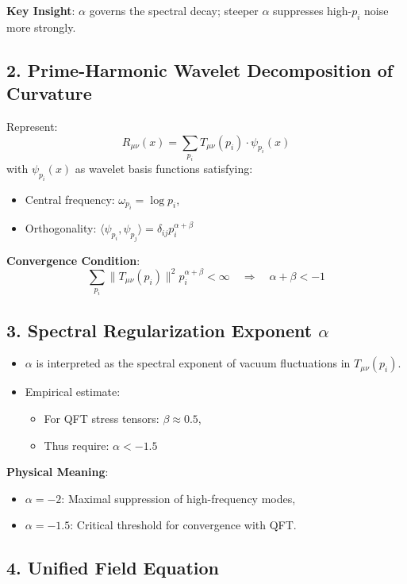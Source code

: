 \documentclass[12pt]{article}
\theoremstyle{plain}
\begin{document}
\textbf{Key Insight}: \(\alpha\) governs the spectral decay; steeper \(\alpha\) suppresses high-\(p_i\) noise more strongly.

\subsection*{2. Prime-Harmonic Wavelet Decomposition of Curvature}

Represent:
\[
R_{\mu\nu}(x) = \sum_{p_i} T_{\mu\nu}(p_i) \cdot \psi_{p_i}(x)
\]
with \(\psi_{p_i}(x)\) as wavelet basis functions satisfying:
\begin{itemize}
    \item Central frequency: \(\omega_{p_i} = \log p_i\),
    \item Orthogonality: \(\langle \psi_{p_i}, \psi_{p_j} \rangle = \delta_{ij} p_i^{\alpha + \beta}\)
\end{itemize}

\textbf{Convergence Condition}:
\[
\sum_{p_i} \|T_{\mu\nu}(p_i)\|^2 p_i^{\alpha + \beta} < \infty
\quad \Rightarrow \quad \alpha + \beta < -1
\]

\subsection*{3. Spectral Regularization Exponent \(\alpha\)}

\begin{itemize}
    \item \(\alpha\) is interpreted as the spectral exponent of vacuum fluctuations in \(T_{\mu\nu}(p_i)\).
    \item Empirical estimate:
    \begin{itemize}
        \item For QFT stress tensors: \(\beta \approx 0.5\),
        \item Thus require: \(\alpha < -1.5\)
    \end{itemize}
\end{itemize}

\textbf{Physical Meaning}:
\begin{itemize}
    \item \(\alpha = -2\): Maximal suppression of high-frequency modes,
    \item \(\alpha = -1.5\): Critical threshold for convergence with QFT.
\end{itemize}

\subsection*{4. Unified Field Equation}
\end{document}
